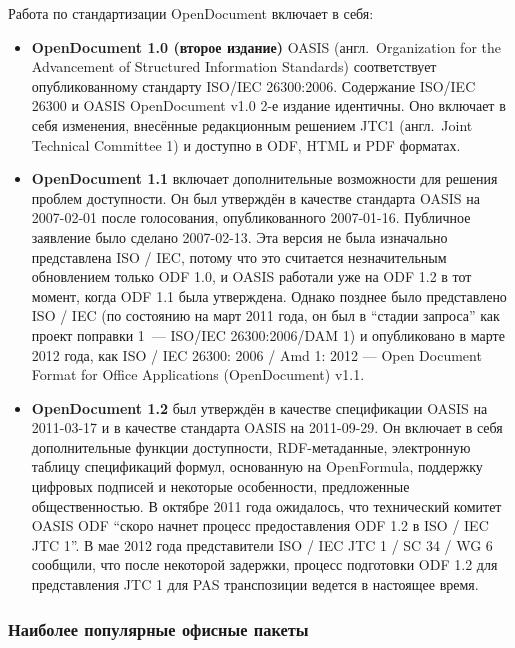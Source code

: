 \noindent
Работа по стандартизации OpenDocument включает в себя:
\begin{itemize}
    \item \textbf{OpenDocument 1.0 (второе издание)} OASIS (англ.\ Organization for the Advancement of Structured Information Standards) соответствует опубликованному стандарту ISO/IEC 26300:2006. Содержание ISO/IEC 26300 и OASIS OpenDocument v1.0 2-е издание идентичны. Оно включает в себя изменения, внесённые редакционным решением JTC1 (англ.\ Joint Technical Committee 1) и доступно в ODF, HTML и PDF форматах.
    \item \textbf{OpenDocument 1.1} включает дополнительные возможности для решения проблем доступности. Он был утверждён в качестве стандарта OASIS на 2007-02-01 после голосования, опубликованного 2007-01-16. Публичное заявление было сделано 2007-02-13. Эта версия не была изначально представлена ISO / IEC, потому что это считается незначительным обновлением только ODF 1.0, и OASIS работали уже на ODF 1.2 в тот момент, когда ODF 1.1 была утверждена. Однако позднее было представлено ISO / IEC (по состоянию на март 2011 года, он был в \enquote{стадии запроса} как проект поправки 1~--- ISO/IEC 26300:2006/DAM 1) и опубликовано в марте 2012 года, как ISO / IEC 26300: 2006 / Amd 1: 2012 --- Open Document Format for Office Applications (OpenDocument) v1.1. %
    \item  \textbf{OpenDocument 1.2} был утверждён в качестве спецификации OASIS на 2011-03-17 и в качестве стандарта OASIS на 2011-09-29. Он включает в себя дополнительные функции доступности, RDF-метаданные, электронную таблицу спецификаций формул, основанную на OpenFormula, поддержку цифровых подписей и некоторые особенности, предложенные общественностью. В октябре 2011 года ожидалось, что технический комитет OASIS ODF \enquote{скоро начнет процесс предоставления ODF 1.2 в ISO / IEC JTC 1}. В мае 2012 года представители ISO / IEC JTC 1 / SC 34 / WG 6 сообщили, что после некоторой задержки, процесс подготовки ODF 1.2 для представления JTC 1 для PAS транспозиции ведется в настоящее время. %
\end{itemize}

\subsubsection{Наиболее популярные офисные пакеты}\label{subsubsec:popular-office-suites}

